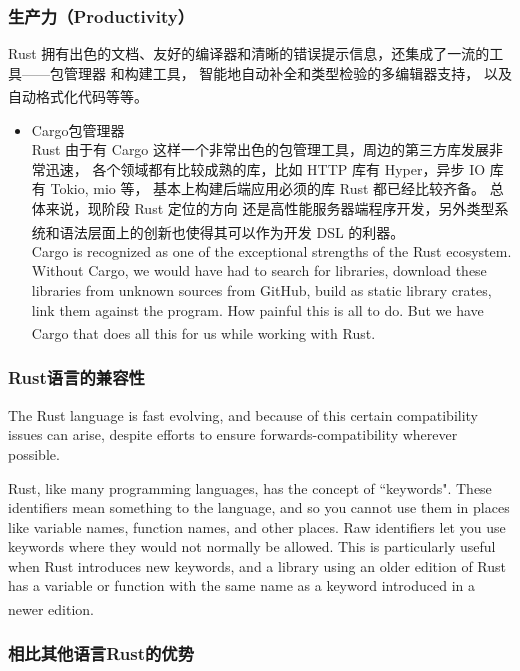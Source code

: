 \documentclass[UTF8,fontset=none,linespread=1.15]{ctexart}
\let\nosupcite\cite
\renewcommand*{\cite}[1]{\textsuperscript{\nosupcite{#1}}}
\begin{document}
\subsubsection{生产力（Productivity）}

Rust 拥有出色的文档、友好的编译器和清晰的错误提示信息，还集成了一流的工具——包管理器
和构建工具， 智能地自动补全和类型检验的多编辑器支持， 以及自动格式化代码等等。\cite{bib:1-rust-lang}

\begin{itemize}
\item Cargo包管理器\\
  Rust 由于有 Cargo 这样一个非常出色的包管理工具，周边的第三方库发展非常迅速，
  各个领域都有比较成熟的库，比如 HTTP 库有 Hyper，异步 IO 库有 Tokio, mio 等，
  基本上构建后端应用必须的库 Rust 都已经比较齐备。 总体来说，现阶段 Rust 定位的方向
  还是高性能服务器端程序开发，另外类型系统和语法层面上的创新也使得其可以作为开发 DSL
  的利器。\cite{bib:2-why-rust}\\
  Cargo is recognized as one of the exceptional strengths of the Rust ecosystem.
  Without Cargo, we would have had to search for libraries, download these
  libraries from unknown sources from GitHub, build as static library crates,
  link them against the program. How painful this is all to do. But we have
  Cargo that does all this for us while working with Rust.\cite{bib:7-rust-by-num}
\end{itemize}
\subsubsection{Rust语言的兼容性}

The Rust language is fast evolving, and because of this certain compatibility
issues can arise, despite efforts to ensure forwards-compatibility wherever possible.

Rust, like many programming languages, has the concept of ``keywords". These
identifiers mean something to the language, and so you cannot use them in places
like variable names, function names, and other places. Raw identifiers let you use
keywords where they would not normally be allowed. This is particularly useful
when Rust introduces new keywords, and a library using an older edition of Rust
has a variable or function with the same name as a keyword introduced in a newer edition.\cite{bib:8-rust-compatibility}

\subsubsection{相比其他语言Rust的优势}
\end{document}
